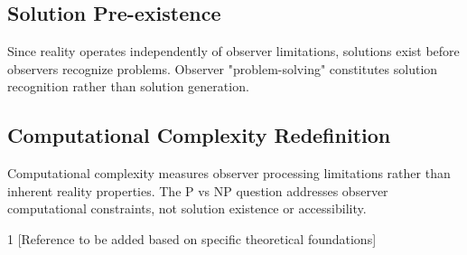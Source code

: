\documentclass{article}
\begin{document}
\subsection{Solution Pre-existence}
Since reality operates independently of observer limitations, solutions exist before observers recognize problems. Observer "problem-solving" constitutes solution recognition rather than solution generation.

\subsection{Computational Complexity Redefinition}
Computational complexity measures observer processing limitations rather than inherent reality properties. The P vs NP question addresses observer computational constraints, not solution existence or accessibility.


\begin{thebibliography}{1}
 [Reference to be added based on specific theoretical foundations]
\end{thebibliography}
\end{document}
